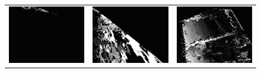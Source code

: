\documentclass[11pt]{report}
\begin{document}
\begin{figure}[H]
\begin{tabular}{ccc}
    \includegraphics[scale=0.1]{images/disparity-opencv-t/disparity_7.png} &
    \includegraphics[scale=0.1]{images/disparity-opencv-d/disparity_7.png} &
    \includegraphics[scale=0.1]{images/disparity-opengv/disparity_7.png} \\

\end{tabular}
\end{figure}
\end{document}
